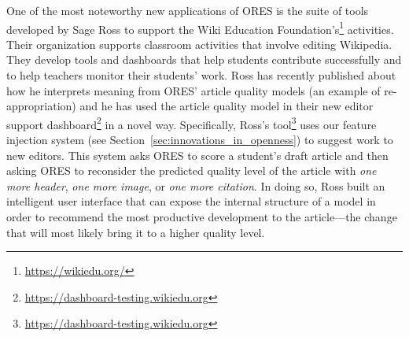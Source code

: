 One of the most noteworthy new applications of ORES is the suite of tools developed by Sage Ross to support the Wiki Education Foundation's\footnote{\url{https://wikiedu.org/}} activities.  Their organization supports classroom activities that involve editing Wikipedia.  They develop tools and dashboards that help students contribute successfully and to help teachers monitor their students' work.  Ross has recently published about how he interprets meaning from ORES' article quality models\cite{ross2016visualizing} (an example of re-appropriation) and he has used the article quality model in their new editor support dashboard\footnote{\url{https://dashboard-testing.wikiedu.org}} in a novel way.  Specifically, Ross's tool\footnote{\url{https://dashboard-testing.wikiedu.org}} uses our feature injection system (see Section~\ref{sec:innovations_in_openness}) to suggest work to new editors.  This system asks ORES to score a student's draft article and then asking ORES to reconsider the predicted quality level of the article with \emph{one more header}, \emph{one more image}, or \emph{one more citation}. In doing so, Ross built an intelligent user interface that can expose the internal structure of a model in order to recommend the most productive development to the article---the change that will most likely bring it to a higher quality level.
